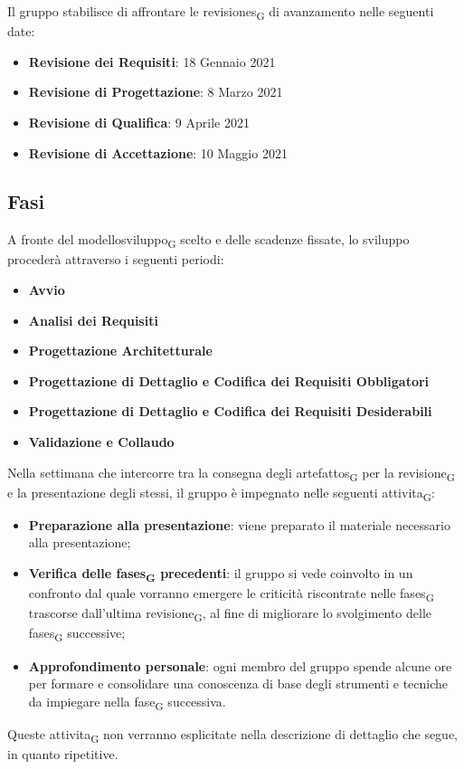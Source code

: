 Il gruppo stabilisce di affrontare le \glspl{revisione}\textsubscript{G} di avanzamento nelle seguenti date:
\begin{itemize}
	\item \textbf{Revisione dei Requisiti}: 18 Gennaio 2021
	\item \textbf{Revisione di Progettazione}: 8 Marzo 2021 
	\item \textbf{Revisione di Qualifica}: 9 Aprile 2021
	\item \textbf{Revisione di Accettazione}: 10 Maggio 2021	
\end{itemize}





\subsection{Fasi}

A fronte del \gls{modellosviluppo}\textsubscript{G} scelto e delle scadenze fissate, lo sviluppo procederà attraverso i seguenti periodi:
\begin{itemize}
	\item \textbf{Avvio}
	\item \textbf{Analisi dei Requisiti}
	\item \textbf{Progettazione Architetturale}
	\item \textbf{Progettazione di Dettaglio e Codifica dei Requisiti Obbligatori}
	\item \textbf{Progettazione di Dettaglio e Codifica dei Requisiti Desiderabili}
	\item \textbf{Validazione e Collaudo}
\end{itemize}


Nella settimana che intercorre tra la consegna degli \glspl{artefatto}\textsubscript{G} per la \gls{revisione}\textsubscript{G} e la presentazione degli stessi, il gruppo è impegnato nelle seguenti \gls{attivita}\textsubscript{G}: 
\begin{itemize}
	\item \textbf{Preparazione alla presentazione}: viene preparato il materiale necessario alla presentazione;
	\item \textbf{Verifica delle \glspl{fase}\textsubscript{G} precedenti}: il gruppo si vede coinvolto in un confronto dal quale vorranno emergere le criticità riscontrate nelle \glspl{fase}\textsubscript{G} trascorse dall'ultima \gls{revisione}\textsubscript{G}, al fine di migliorare lo svolgimento delle \glspl{fase}\textsubscript{G} successive;
	\item \textbf{Approfondimento personale}: ogni membro del gruppo spende alcune ore per formare e consolidare una conoscenza di base degli strumenti e tecniche da impiegare nella \gls{fase}\textsubscript{G} successiva.
\end{itemize}
Queste \gls{attivita}\textsubscript{G} non verranno esplicitate nella descrizione di dettaglio che segue, in quanto ripetitive.



